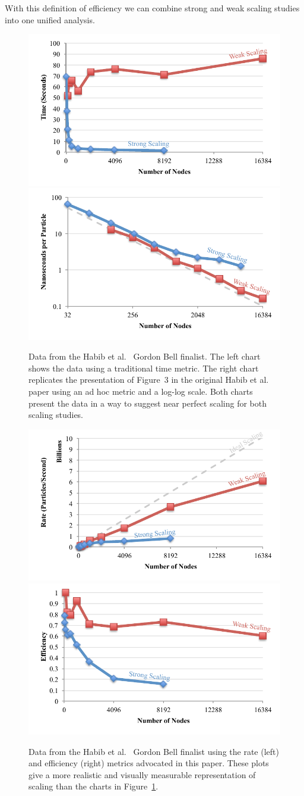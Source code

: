 \documentclass[conference]{IEEEtran}
\newcommand*{\scite}[1]{~\cite{#1}}
\newcommand{\etal}{et al.\xspace}
\newcommand{\fix}[1]{}
\begin{document}
With this definition of efficiency we can combine strong and weak scaling
studies into one unified analysis. \fix{Does this need to be explained
  more?}


\begin{figure}
  \includegraphics[width=.5\linewidth]{images/HabibTime}%
  \includegraphics[width=.5\linewidth]{images/HabibTimePerParticle}
  \caption{Data from the Habib \etal\scite{Habib2013} Gordon Bell
    finalist. The left chart shows the data using a traditional time
    metric. The right chart replicates the presentation of Figure~3 in the
    original Habib \etal paper using an ad hoc metric and a log-log
    scale. Both charts present the data in a way to suggest near perfect
    scaling for both scaling studies.}
  \label{fig:HabibTraditional}
\end{figure}

\begin{figure}
  \includegraphics[width=.5\linewidth]{images/HabibRate}%
  \includegraphics[width=.5\linewidth]{images/HabibEfficiency}
  \caption{Data from the Habib \etal\scite{Habib2013} Gordon Bell finalist
    using the rate (left) and efficiency (right) metrics advocated in this
    paper. These plots give a more realistic and visually measurable
    representation of scaling than the charts in
    Figure~\ref{fig:HabibTraditional}.}
  \label{fig:HabibBetter}
\end{figure}
\end{document}
